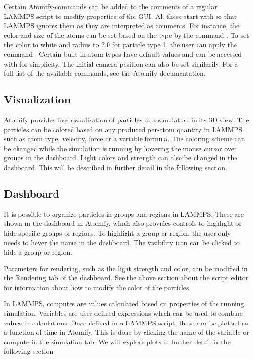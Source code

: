 \documentclass[aps,pre,twocolumn,letterpaper,floatfix,nofootinbib]{revtex4}
\begin{document}
Certain Atomify-commands can be added to the comments of a regular LAMMPS script
to modify properties of the GUI. All these start with \keys{\texttt{\#}} so that
LAMMPS ignores them as they are interpreted as comments.
For instance, the color and size of the atoms can be set based on the type by
the command .
To set the color to white and radius to 2.0 for particle type 1,
the user can apply the command . Certain built-in atom
types have default values and can be accessed with  for simplicity.
The initial camera position can also be set similarily.
For a full list of the available commands, see the Atomify documentation\cite{atomifydocumentation}.

\subsection{Visualization}

Atomify provides live visualization of particles in a simulation in its 3D view. 
The particles can be colored based on any produced per-atom quantity in LAMMPS such as
atom type, velocity, force or a variable formula.
The coloring scheme can be changed while the simulation is running by hovering
the mouse cursor over groups in the dashboard.
Light colors and strength can also be changed in the dashboard.
This will be described in further detail in the following section.

\subsection{Dashboard}

It is possible to organize particles in groups and regions in LAMMPS.
These are shown in the dashboard in Atomify, which also provides controls to
highlight or hide specific groups or regions.
To highlight a group or region, the user only needs to hover the name in the
dashboard.
The visibility icon can be clicked to hide a group or region.

Parameters for rendering, such as the light strength and color,
can be modified in the Rendering tab of the dashboard.
See the above section about the script editor for information about how to
modify the color of the particles.

In LAMMPS, computes are values calculated based on properties of the running
simulation.
Variables are user defined expressions which can be used to combine values in
calculations.
Once defined in a LAMMPS script, these can be plotted as a function of time in
Atomify.
This is done by clicking the name of the variable or compute in the simulation
tab.
We will explore plots in further detail in the following section.
\end{document}
